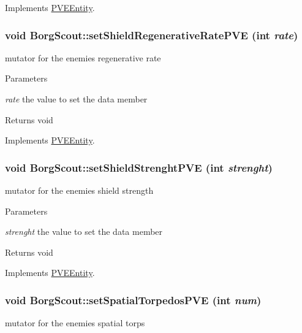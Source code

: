 Implements \hyperlink{classPVEEntity}{PVEEntity}.

\hypertarget{classBorgScout_a500ce15b9d01c79a8f7ebefe060b0d6a}{
\subsubsection[{setShieldRegenerativeRatePVE}]{\setlength{\rightskip}{0pt plus 5cm}void BorgScout::setShieldRegenerativeRatePVE (int {\em rate})}}
\label{d5/d8c/classBorgScout_a500ce15b9d01c79a8f7ebefe060b0d6a}
mutator for the enemies regenerative rate


\begin{DoxyParams}{Parameters}
\item[{\em rate}]the value to set the data member\end{DoxyParams}
\begin{DoxyReturn}{Returns}
void 
\end{DoxyReturn}


Implements \hyperlink{classPVEEntity}{PVEEntity}.

\hypertarget{classBorgScout_a281c1d904ce2a40d6441b43cafb207c9}{
\subsubsection[{setShieldStrenghtPVE}]{\setlength{\rightskip}{0pt plus 5cm}void BorgScout::setShieldStrenghtPVE (int {\em strenght})}}
\label{d5/d8c/classBorgScout_a281c1d904ce2a40d6441b43cafb207c9}
mutator for the enemies shield strength


\begin{DoxyParams}{Parameters}
\item[{\em strenght}]the value to set the data member\end{DoxyParams}
\begin{DoxyReturn}{Returns}
void 
\end{DoxyReturn}


Implements \hyperlink{classPVEEntity}{PVEEntity}.

\hypertarget{classBorgScout_ac911250166eb1fa47f602ead65f7b834}{
\subsubsection[{setSpatialTorpedosPVE}]{\setlength{\rightskip}{0pt plus 5cm}void BorgScout::setSpatialTorpedosPVE (int {\em num})}}
\label{d5/d8c/classBorgScout_ac911250166eb1fa47f602ead65f7b834}
mutator for the enemies spatial torps


